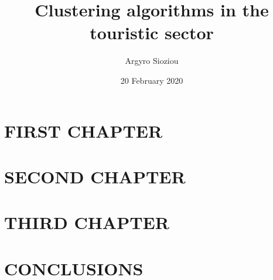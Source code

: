 \documentclass[
12pt, %
onside] %
{book} %
\title{Clustering algorithms in the touristic sector}
\author{Argyro Sioziou}
\date{20 February 2020}
\begin{document}


\tableofcontents

\chapter{FIRST CHAPTER}


\chapter{SECOND CHAPTER}


\chapter{THIRD CHAPTER}


\chapter{CONCLUSIONS}


\printbibliography
\end{document}
